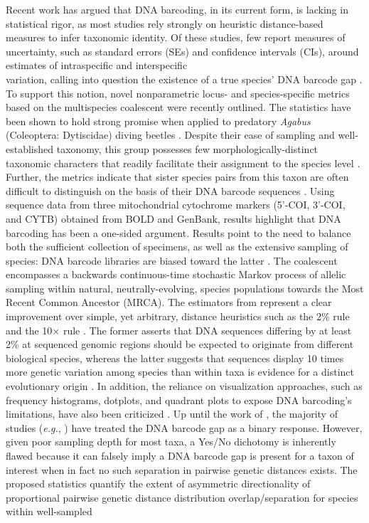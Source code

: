 \documentclass[12pt]{article}
\begin{document}
Recent work has argued that DNA barcoding, in its current form, is lacking in statistical rigor, as most studies rely strongly on heuristic distance-based measures to infer taxonomic identity. Of these studies, few report measures of uncertainty, such as standard errors (SEs) and confidence intervals (CIs), around estimates of intraspecific and interspecific \\ variation, calling into question the existence of a true species' DNA barcode gap \citep{candek2015dna, phillips2022lack}. To support this notion, novel nonparametric locus- and species-specific metrics based on the multispecies coalescent \citep{rannala2003bayes, yang2017bayesian} were recently outlined. The statistics have been shown to hold strong promise when applied to predatory \textit{Agabus} (Coleoptera: Dytiscidae) diving beetles \citep{phillips2024measure}. Despite their ease of sampling and well-established taxonomy, this group possesses few morphologically-distinct taxonomic characters that readily facilitate their assignment to the species level \citep{bergsten2012effect}. Further, the metrics indicate that sister species pairs from this taxon are often difficult to distinguish on the basis of their DNA barcode sequences \citep{phillips2024measure}. Using sequence data from three mitochondrial cytochrome markers (5'-COI, 3'-COI, and CYTB) obtained from BOLD and GenBank, results highlight that DNA barcoding has been a one-sided argument. Results point to the need to balance both the sufficient collection of specimens, as well as the extensive sampling of species: DNA barcode libraries are biased toward the latter \citep{phillips2024measure}. The coalescent \citep{kingman1982coalescent, kingman1982genealogy} encompasses a backwards continuous-time stochastic Markov process of allelic sampling within natural, neutrally-evolving, species populations towards the Most Recent Common Ancestor (MRCA). The estimators from \citet{phillips2024measure} represent a clear improvement over simple, yet arbitrary, distance heuristics such as the 2\% rule \citep{hebert2003biological} and the 10$\times$ rule \citep{hebert2004identification}. The former asserts that DNA sequences differing by at least 2\% at sequenced genomic regions should be expected to originate from different biological species, whereas the latter suggests that sequences display 10 times more genetic variation among species than within taxa is evidence for a distinct evolutionary origin . In addition, the reliance on visualization approaches, such as frequency histograms, dotplots, and quadrant plots to expose DNA barcoding's limitations, have also been criticized \citep{collins2013seven, phillips2022lack}. Up until the work of \cite{phillips2024measure}, the majority of studies (\textit{e.g.}, \citet{young2021macer}) have treated the DNA barcode gap as a binary response. However, given poor sampling depth for most taxa, a Yes/No dichotomy is inherently flawed because it can falsely imply a DNA barcode gap is present for a taxon of interest when in fact no such separation in pairwise genetic distances exists. The proposed statistics quantify the extent of asymmetric directionality of proportional pairwise genetic distance distribution overlap/separation for species within well-sampled 
\end{document}
